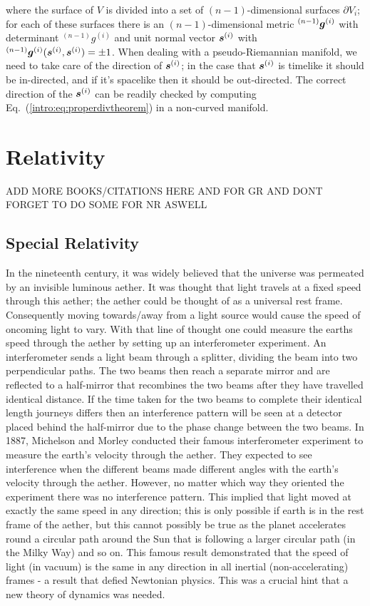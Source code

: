 where the surface of $V$ is divided into a set of $(n-1)$-dimensional surfaces $\partial V_i$; for each of these surfaces there is an $(n-1)$-dimensional metric ${}^{(n-1)}\boldsymbol{g}^{(i)}$ with determinant ${}^{(n-1)} g ^{(i)}$ and unit normal vector $\boldsymbol{s}^{(i)}$ with ${}^{(n-1)}\boldsymbol{g}^{(i)}(\boldsymbol{s}^{(i)},\boldsymbol{s}^{(i)})=\pm 1$. When dealing with a pseudo-Riemannian manifold, we need to take care of the direction of $\boldsymbol{s}^{(i)}$; in the case that $\boldsymbol{s}^{(i)}$ is timelike it should be in-directed, and if it's spacelike then it should be out-directed. The correct direction of the $\boldsymbol{s}^{(i)}$ can be readily checked by computing Eq.~(\ref{intro:eq:properdivtheorem}) in a non-curved manifold.

\newpage
\section{Relativity}

\color{gren} ADD MORE BOOKS/CITATIONS HERE AND FOR GR AND DONT FORGET TO DO SOME FOR NR ASWELL \color{black}

\subsection{Special Relativity}

In the nineteenth century, it was widely believed that the universe was permeated by an invisible luminous aether. It was thought that light travels at a fixed speed through this aether; the aether could be thought of as a universal rest frame. Consequently moving towards/away from a light source would cause the speed of oncoming light to vary. With that line of thought one could measure the earths speed through the aether by setting up an interferometer experiment. An interferometer sends a light beam through a splitter, dividing the beam into two perpendicular paths. The two beams then reach a separate mirror and are reflected to a half-mirror that recombines the two beams after they have travelled identical distance. If the time taken for the two beams to complete their identical length journeys differs then an interference pattern will be seen at a detector placed behind the half-mirror due to the phase change between the two beams. In 1887, Michelson and Morley conducted their famous interferometer experiment to measure the earth's velocity through the aether. They expected to see interference when the different beams made different angles with the earth's velocity through the aether. However, no matter which way they oriented the experiment there was no interference pattern. This implied that light moved at exactly the same speed in any direction; this is only possible if earth is in the rest frame of the aether, but this cannot possibly be true as the planet accelerates round a circular path around the Sun that is following a larger circular path (in the Milky Way) and so on. This famous result demonstrated that the speed of light (in vacuum) is the same in any direction in all inertial (non-accelerating) frames - a result that defied Newtonian physics. This was a crucial hint that a new theory of dynamics was needed. 


